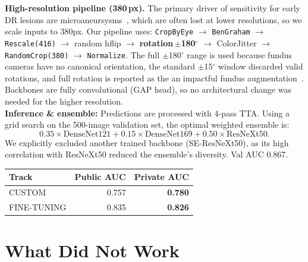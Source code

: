 \documentclass[a4paper, 10pt, twocolumn]{article}
\begin{document}
\textbf{High-resolution pipeline (380\,px).} The primary driver of sensitivity for early DR
lesions are microaneursysms~\cite{abramoff2018pivotal}, which are often lost at lower resolutions, so we scale inputs to 380px. Our pipeline uses: \texttt{CropByEye} $\to$
\texttt{BenGraham} $\to$ \texttt{Rescale(416)} $\to$ random hflip $\to$
\textbf{rotation\,$\pm$180$^\circ$} $\to$ ColorJitter $\to$
\texttt{RandomCrop(380)} $\to$ \texttt{Normalize}. The full $\pm$180$^\circ$
range is used because fundus cameras have no canonical orientation, the
standard $\pm$15$^\circ$ window discarded valid rotations,
and full rotation is reported as the an impactful fundus
augmentation~\cite{graham2015kaggle}. Backbones are fully convolutional
(GAP head), so no architectural change was needed for the higher resolution.\\
\textbf{Inference \& ensemble:} Predictions are processed with 4-pass TTA. Using a grid search on the 500-image validation set, the optimal weighted ensemble is:$$0.35 \times \text{DenseNet121} + 0.15 \times \text{DenseNet169} + 0.50 \times \text{ResNeXt50}.$$
We explicitly excluded another trained backbone (SE-ResNeXt50), as its high correlation with ResNeXt50 reduced the ensemble's diversity. Val AUC 0.867. 

\begin{table}[htbp]
    \centering
    \label{tab:final_results}
    \begin{tabular}{lrr}
        \toprule
        \textbf{Track} & \textbf{Public AUC} & \textbf{Private AUC} \\
        \midrule
        CUSTOM & 0.757 &\textbf{ 0.780} \\
        FINE-TUNING    & 0.835 & \textbf{0.826} \\
        \bottomrule
    \end{tabular}
\end{table}

\section{What Did Not Work}
\end{document}
